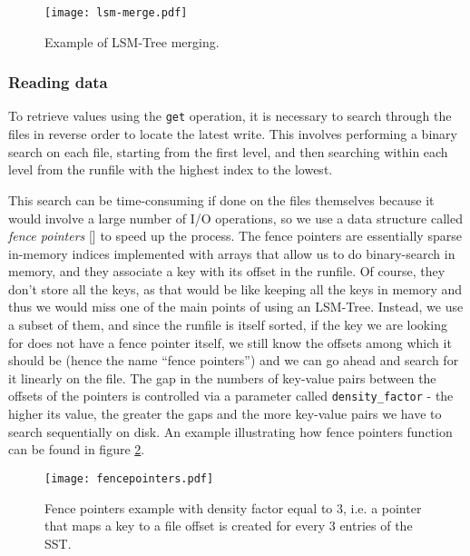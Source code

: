 \vspace{20px}
\begin{figure}[h]
    \centering
    \texttt{[image: lsm-merge.pdf]}
    \caption{Example of LSM-Tree merging.}
    \label{fig:lsm-merge}
\end{figure}
\vspace{20px}

\subsubsection{Reading data}

To retrieve values using the \verb"get" operation, it is necessary to search through the files in reverse order to locate the latest write.
This involves performing a binary search on each file, starting from the first level, and then searching within each level from the runfile with the highest index to the lowest.

This search can be time-consuming if done on the files themselves because it would involve a large number of I/O operations, so we use a data structure called \textit{fence pointers} [\cite{fence-pointers}] to speed up the process. The fence pointers are essentially sparse in-memory indices implemented with arrays that allow us to do binary-search in memory, and they associate a key with its offset in the runfile. Of course, they don't store all the keys, as that would be like keeping all the keys in memory and thus we would miss one of the main points of using an LSM-Tree. Instead, we use a subset of them, and since the runfile is itself sorted, if the key we are looking for does not have a fence pointer itself, we still know the offsets among which it should be (hence the name ``fence pointers'') and we can go ahead and search for it linearly on the file. The gap in the numbers of key-value pairs between the offsets of the pointers is controlled via a parameter called \verb"density_factor" - the higher its value, the greater the gaps and the more key-value pairs we have to search sequentially on disk. An example illustrating how fence pointers function can be found in figure \ref{fig:fence-pointers}.

\vspace{20px}
\begin{figure}[h]
    \centering
    \texttt{[image: fencepointers.pdf]}
    \caption{Fence pointers example with density factor equal to 3, i.e. a pointer that maps a key to a file offset is created for every 3 entries of the SST.}
    \label{fig:fence-pointers}
\end{figure}
\vspace{20px}


